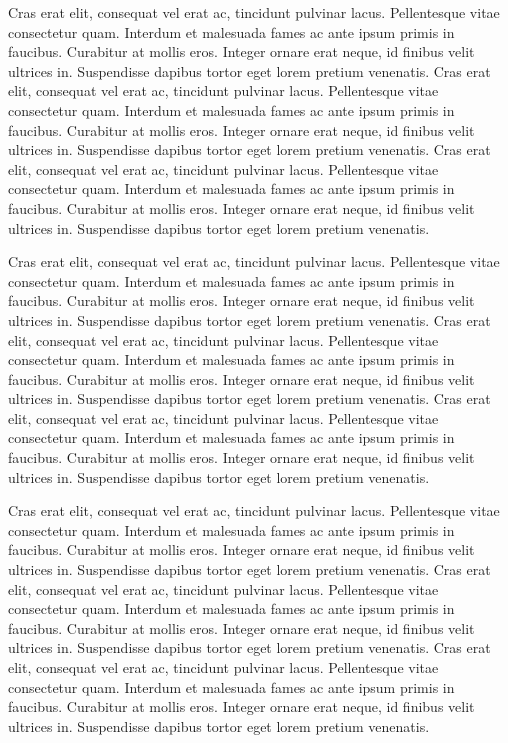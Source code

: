 \documentclass[./main.tex]{subfiles}
\begin{document}
\par Cras erat elit, consequat vel erat ac, tincidunt pulvinar lacus. Pellentesque vitae consectetur quam. Interdum et malesuada fames ac ante ipsum primis in faucibus. Curabitur at mollis eros. Integer ornare erat neque, id finibus velit ultrices in. Suspendisse dapibus tortor eget lorem pretium venenatis. Cras erat elit, consequat vel erat ac, tincidunt pulvinar lacus. Pellentesque vitae consectetur quam. Interdum et malesuada fames ac ante ipsum primis in faucibus. Curabitur at mollis eros. Integer ornare erat neque, id finibus velit ultrices in. Suspendisse dapibus tortor eget lorem pretium venenatis. Cras erat elit, consequat vel erat ac, tincidunt pulvinar lacus. Pellentesque vitae consectetur quam. Interdum et malesuada fames ac ante ipsum primis in faucibus. Curabitur at mollis eros. Integer ornare erat neque, id finibus velit ultrices in. Suspendisse dapibus tortor eget lorem pretium venenatis.

\par Cras erat elit, consequat vel erat ac, tincidunt pulvinar lacus. Pellentesque vitae consectetur quam. Interdum et malesuada fames ac ante ipsum primis in faucibus. Curabitur at mollis eros. Integer ornare erat neque, id finibus velit ultrices in. Suspendisse dapibus tortor eget lorem pretium venenatis. Cras erat elit, consequat vel erat ac, tincidunt pulvinar lacus. Pellentesque vitae consectetur quam. Interdum et malesuada fames ac ante ipsum primis in faucibus. Curabitur at mollis eros. Integer ornare erat neque, id finibus velit ultrices in. Suspendisse dapibus tortor eget lorem pretium venenatis. Cras erat elit, consequat vel erat ac, tincidunt pulvinar lacus. Pellentesque vitae consectetur quam. Interdum et malesuada fames ac ante ipsum primis in faucibus. Curabitur at mollis eros. Integer ornare erat neque, id finibus velit ultrices in. Suspendisse dapibus tortor eget lorem pretium venenatis.

\par Cras erat elit, consequat vel erat ac, tincidunt pulvinar lacus. Pellentesque vitae consectetur quam. Interdum et malesuada fames ac ante ipsum primis in faucibus. Curabitur at mollis eros. Integer ornare erat neque, id finibus velit ultrices in. Suspendisse dapibus tortor eget lorem pretium venenatis. Cras erat elit, consequat vel erat ac, tincidunt pulvinar lacus. Pellentesque vitae consectetur quam. Interdum et malesuada fames ac ante ipsum primis in faucibus. Curabitur at mollis eros. Integer ornare erat neque, id finibus velit ultrices in. Suspendisse dapibus tortor eget lorem pretium venenatis. Cras erat elit, consequat vel erat ac, tincidunt pulvinar lacus. Pellentesque vitae consectetur quam. Interdum et malesuada fames ac ante ipsum primis in faucibus. Curabitur at mollis eros. Integer ornare erat neque, id finibus velit ultrices in. Suspendisse dapibus tortor eget lorem pretium venenatis.
\end{document}
